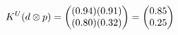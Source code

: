 \documentclass[preview]{standalone}
\begin{document}
\begin{align*}
\special{dvisvgm:raw <g id='unique000'>}K^U(d \otimes p) = \begin{pmatrix} (0.94)(0.91) \\ (0.80)(0.32) \end{pmatrix} = \begin{pmatrix} 0.85 \\ 0.25 \end{pmatrix}\special{dvisvgm:raw </g>}
\end{align*}
\end{document}
